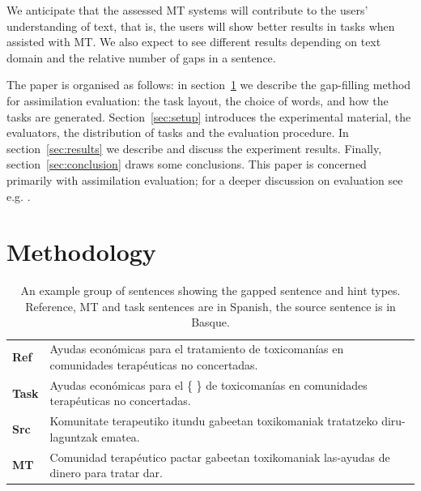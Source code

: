 \documentclass[11pt]{article}
\begin{document}
We anticipate that the assessed MT systems will contribute to the users' understanding of text, that is, the users will show better results in tasks when assisted with MT. We also expect to see different results depending on text domain and the relative number of gaps in a sentence.

The paper is organised as follows: in section~\ref{sec:methodology} we describe the gap-filling method for assimilation evaluation: the task layout, the choice of words, and how the tasks are generated. Section~\ref{sec:setup} introduces the experimental material, the evaluators, the distribution of tasks and the evaluation procedure. In section~\ref{sec:results} we describe and discuss the experiment results. Finally, section~\ref{sec:conclusion} draws some conclusions. This paper is concerned primarily with assimilation evaluation; for a deeper discussion on evaluation see e.g. \citep{koehn2009}.


\section{Methodology}
\label{sec:methodology}

\begin{table}
  \centering
  \begin{tabular}{|l|l|}
     \hline
     \textbf{Ref}  & Ayudas econ\'{o}micas para el tratamiento de toxicoman\'{i}as en comunidades terap\'{e}uticas no concertadas. \\
     \textbf{Task} & Ayudas econ\'{o}micas para el \{ \} de toxicoman\'{i}as en comunidades terap\'{e}uticas no concertadas. \\
     \textbf{Src}  & Komunitate terapeutiko itundu gabeetan toxikomaniak tratatzeko diru-laguntzak ematea. \\
     \textbf{MT}   & Comunidad terap\'{e}utico pactar gabeetan toxikomaniak las-ayudas de dinero para tratar dar. \\
     \hline
  \end{tabular}
  \caption{An example group of sentences showing the gapped sentence and hint types. Reference, MT and task sentences are in Spanish, the source sentence is in Basque.} 
  \label{table:example}
\end{table}
\end{document}
